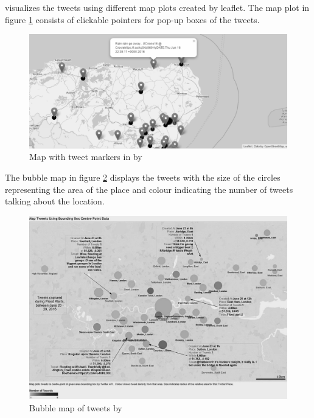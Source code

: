  visualizes the tweets using different map plots
 created by leaflet. The map plot in figure \ref{fig:baker_marker} consists of clickable pointers for pop-up boxes of the tweets.

\begin{figure}[H]
\begin{center}
  \includegraphics[width=\columnwidth]{images/baker_marker.png}
\end{center}
\caption{Map with tweet markers in by }
\label{fig:baker_marker}
\end{figure}

The bubble map in figure \ref{fig:baker_bubble} displays the tweets with the size of the circles
representing the area of the place and colour indicating the number of tweets talking about the
location.
\begin{figure}[H]
\begin{center}
  \includegraphics[width=\columnwidth]{./images/baker_bubble.png}
\end{center}
\caption{Bubble map of tweets by }
\label{fig:baker_bubble}
\end{figure}
